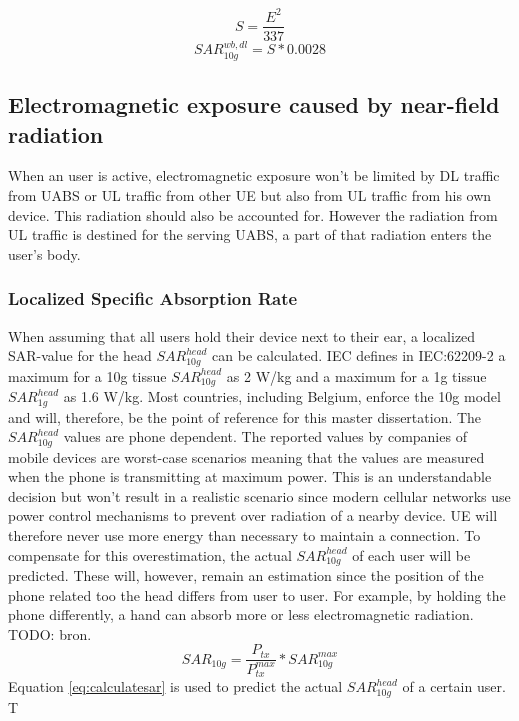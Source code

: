 \begin{equation}
S  = \frac{E^2}{337}
\label{eq:flux}
\end{equation}
\begin{equation}
SAR^{wb,dl}_{10g} = S * 0.0028
\label{eq:convertion}
\end{equation}

\subsection{Electromagnetic exposure caused by near-field radiation}
\label{sub:Uplinkexposure}

When an user is active, electromagnetic exposure won't be limited by \gls{DL} traffic from \gls{UABS} or \gls{UL} traffic 
from other \gls{UE} but also from \gls{UL} traffic from his own device. This radiation should also be accounted for.
However the radiation from \gls{UL} traffic is destined for the serving \gls{UABS}, a part of that radiation enters the user's body.

\subsubsection{Localized Specific Absorption Rate}

When assuming that all users hold their device next to their ear, a localized SAR-value for the head $SAR^{head}_{10g}$ can be calculated.
\gls{IEC} defines in IEC:62209-2 a maximum for a 10g tissue $SAR^{head}_{10g}$ as 2 W/kg and a maximum for a 1g tissue $SAR^{head}_{1g}$ as 1.6 W/kg.
Most countries, including Belgium, enforce the 10g model and will, therefore, be the point of reference for this master dissertation.
The $SAR^{head}_{10g}$ values are phone dependent. The reported values by companies of mobile devices are worst-case scenarios meaning that the 
values are measured when the phone is transmitting at maximum power. This is an understandable decision but won't result in a realistic scenario since 
modern cellular networks use power control mechanisms to prevent over radiation of a nearby device. \gls{UE} will therefore never use more energy than 
necessary to maintain a connection.
To compensate for this overestimation, the actual $SAR^{head}_{10g}$ of each user will be predicted. These will, however, remain an estimation since the 
position of the phone related too the head differs from user to user. For example, by holding the phone differently, a hand can absorb more or less 
electromagnetic radiation. TODO: bron.
\begin{equation}
{SAR}_{10g} = \frac{P_{tx}}{P^{max}_{tx}} * {SAR}^{max}_{10g}
\label{eq:calculatesar}
\end{equation}
Equation \ref{eq:calculatesar} is used to predict the actual $SAR^{head}_{10g}$  of a certain user. T


